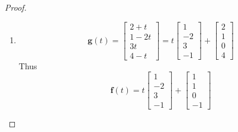 \begin{exercise}
\begin{proof}
\begin{enumerate}
            \item \[ \mathbf{g}(t) = \begin{bmatrix} 2+t \\ 1-2t \\ 3t \\ 4-t \end{bmatrix} = t \begin{bmatrix} 1 \\ -2 \\ 3 \\ -1 \end{bmatrix} + \begin{bmatrix} 2 \\ 1 \\ 0 \\4 \end{bmatrix} \]
            Thus
            \[ \mathbf{f}(t) = t \begin{bmatrix} 1 \\ -2 \\ 3 \\ -1 \end{bmatrix} + \begin{bmatrix} 1 \\ 1 \\ 0 \\ -1 \end{bmatrix} \]
        \end{enumerate}
    \end{proof}
\end{exercise}

